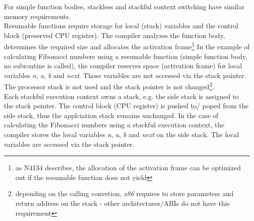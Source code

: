 For simple function bodies, stackless and stackful context switching have
similar memory requirements.\\
\newline
Resumable functions require storage for local (stack) variables and the control
block (preserved CPU register). The compiler analyzes the function body,
determines the required size and allocates the activation frame\footnote{as
N4134 describes, the allocation of the activation frame can be optimized out
if the resumable function does not yield}
In the example of calculating Fibonacci numbers using a resumable function
(simple function body, no subroutine is called), the compiler reserves space
(activation frame) for local variables \emph{n}, \emph{a}, \emph{b} and
\emph{next}. Those variables are not accessed via the stack pointer. The
processor stack is not used and the stack pointer is not
changed\footnote{depending on the calling convetion, \emph{x86} requires to
store parameters and return address on the stack - other architectures/ABIs do
not have this requirement}.\\
\newline
Each stackful execution context owns a stack, e.g. the side stack is assigned to
the stack pointer. The control block (CPU register) is pushed to/ poped from the
side stack, thus the applciation stack remains unchanged.
In the case of calculating the Fibonacci numbers using a stackful execution
context, the compiler stores the local variables \emph{n}, \emph{a},
\emph{b} and \emph{next} on the side stack. The local variables are accessed
via the stack pointer.

